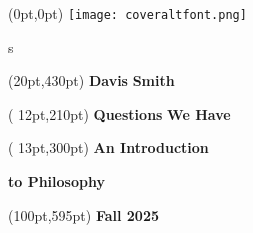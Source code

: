 \documentclass[openany,oneside,14pt]{memoir}
\begin{document}
\begin{textblock*}{8.5in}(0pt,0pt)%
\noindent\texttt{[image: coveraltfont.png]}
\end{textblock*}s

\begin{textblock*}{2in}(20pt,430pt)%
\selectfont\color{philfontgold} \fontsize{20pt}{24pt}\textbf{Davis}
\textbf{Smith}
\selectfont\color{black}
\end{textblock*}

\begin{textblock*}{3in}(	12pt,210pt)%
\selectfont\color{black} \fontsize{20pt}{24pt}\textbf{Questions}
\textbf{We Have}
\selectfont\color{black}
\end{textblock*}


\begin{textblock*}{3in}(	13pt,300pt)%
\selectfont\color{philfontgold} \fontsize{20pt}{24pt}\textbf{An Introduction}

\vspace{-14pt}\textbf{to Philosophy}
\selectfont\color{black}
\end{textblock*}


\begin{textblock*}{2in}(100pt,595pt)%
\selectfont\color{philfontgold}\fontsize{20pt}{24pt} \textbf{Fall 2025}
\selectfont\color{black}
\end{textblock*}

\ 
\newpage

\end{document}

